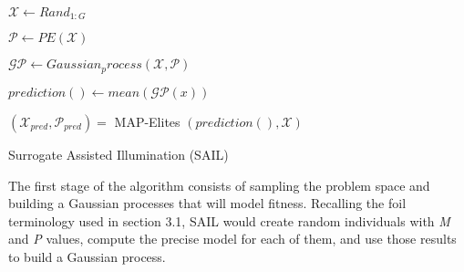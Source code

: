 \documentclass{sig-alternate}
\begin{document}

\begin{algorithm}[h]
\DontPrintSemicolon
\SetAlgoLined
    \thing{}
    
    $\mathcal{X}\leftarrow Rand_{1:G}$ 
    
    
    $\mathcal{P}\leftarrow PE(\mathcal{X})$ %
    
    $\mathcal{G}\mathcal{P}\leftarrow Gaussian_process(\mathcal{X},\mathcal{P})$
    
    \secondStage{}
    
    
    \thirdStage{}
    
    $prediction()\leftarrow mean(\mathcal{GP}(x))$
    
    $(\mathcal{X}_{pred},\mathcal{P}_{pred})=$ MAP-Elites $(prediction(),\mathcal{X})$
    
\caption{Surrogate Assisted Illumination (SAIL)\label{SAIL}}
\end{algorithm}

The first stage of the algorithm consists of sampling the problem space and building a Gaussian processes that will model fitness.
Recalling the foil terminology used in section 3.1, SAIL would create random individuals with \textit{M} and \textit{P} values, compute the precise model for each of them, and use those results to build a Gaussian process.
\end{document}
